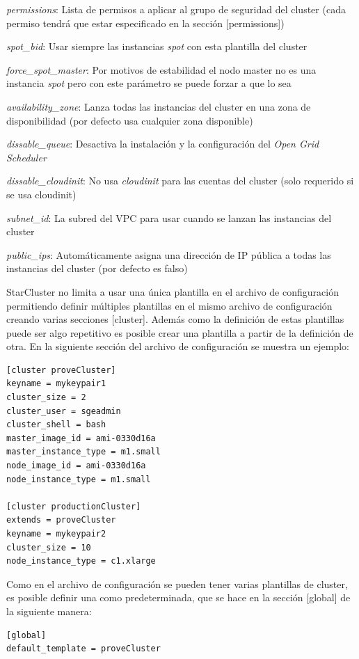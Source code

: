 \documentclass{article}
\begin{document}
{\begin{itemize}
{	\item \emph{permissions}: Lista de permisos a aplicar al grupo de seguridad del cluster (cada permiso tendrá que estar especificado en la sección [permissions])
	\item \emph{spot\_bid}: Usar siempre las instancias \textit{spot}\cite{SpotInstancesEC2} con esta plantilla del cluster
	\item \emph{force\_spot\_master}: Por motivos de estabilidad el nodo master no es una instancia \textit{spot} pero con este parámetro se puede forzar a que lo sea
	\item \emph{availability\_zone}: Lanza todas las instancias del cluster en una zona de disponibilidad (por defecto usa cualquier zona disponible)
	\item \emph{dissable\_queue}: Desactiva la instalación y la configuración del \textit{Open Grid Scheduler}\cite{OpenGridScheduler}
	\item \emph{dissable\_cloudinit}: No usa \emph{cloudinit}\cite{CloudInit} para las cuentas del cluster (solo requerido si se usa cloudinit)
	\item \emph{subnet\_id}: La subred del VPC para usar cuando se lanzan las instancias del cluster
	\item \emph{public\_ips}: Automáticamente asigna una dirección de IP pública a todas las instancias del cluster (por defecto es falso)
}\end{itemize} }

	StarCluster no limita a usar una única plantilla en el archivo de configuración permitiendo definir múltiples plantillas en el mismo archivo de configuración creando varias secciones [cluster]. Además como la definición de estas plantillas puede ser algo repetitivo es posible crear una plantilla a partir de la definición de otra. En la siguiente sección del archivo de configuración se muestra un ejemplo:
\begin{lstlisting}
[cluster proveCluster]
keyname = mykeypair1
cluster_size = 2
cluster_user = sgeadmin
cluster_shell = bash
master_image_id = ami-0330d16a
master_instance_type = m1.small
node_image_id = ami-0330d16a
node_instance_type = m1.small

[cluster productionCluster]
extends = proveCluster
keyname = mykeypair2
cluster_size = 10
node_instance_type = c1.xlarge
\end{lstlisting}
	Como en el archivo de configuración se pueden tener varias plantillas de cluster, es posible definir una como predeterminada, que se hace en la sección [global] de la siguiente manera:
\begin{lstlisting}
[global]
default_template = proveCluster
\end{lstlisting}
\end{document}
